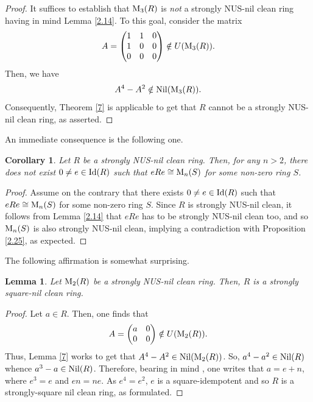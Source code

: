\documentclass[12pt]{amsart}
\newtheorem{lemma}[theorem]{Lemma}
\newtheorem{corollary}[theorem]{Corollary}
\theoremstyle{definition}
\begin{document}
\begin{proof}
It suffices to establish that ${\rm M}_3(R)$ is {\it not} a strongly NUS-nil clean ring having in mind Lemma \ref{2.14}. To this goal, consider the matrix
	$$A =\begin{pmatrix}
		1 & 1 & 0 \\
		1 & 0 & 0 \\
		0 & 0 & 0
\end{pmatrix} \notin U({\rm M}_3(R)).$$ Then, we have $$A^4- A^2 \notin {\rm Nil}({\rm M}_3(R)).$$ Consequently, Theorem \ref{7} is applicable to get that $R$ cannot be a strongly NUS-nil clean ring, as asserted.
\end{proof}

An immediate consequence is the following one.

\begin{corollary}\label{2.35}
Let $R$ be a strongly NUS-nil clean ring. Then, for any $n>2$, there does not exist $0\neq e\in {\rm Id}(R)$ such that $eRe\cong {\rm M}_{n}(S)$ for some non-zero ring $S$.
\end{corollary}

\begin{proof}
Assume on the contrary that there exists $0\neq e\in {\rm Id}(R)$ such that $eRe\cong {\rm M}_{n}(S)$ for some non-zero ring $S$. Since $R$ is strongly NUS-nil clean, it follows from Lemma \ref{2.14} that $eRe$ has to be strongly NUS-nil clean too, and so ${\rm M}_{n}(S)$ is also strongly NUS-nil clean, implying a contradiction with Proposition \ref{2.25}, as expected.
\end{proof}

The following affirmation is somewhat surprising.

\begin{lemma}\label{2.26}
Let ${\rm M}_2(R)$ be a strongly NUS-nil clean ring. Then, $R$ is a strongly square-nil clean ring.
\end{lemma}

\begin{proof}
Let $a \in R$. Then, one finds that $$A=\begin{pmatrix}
		a & 0 \\ 0 & 0
\end{pmatrix} \notin U({\rm M}_2(R)).$$ Thus, Lemma \ref{7} works to get that $A^4-A^2 \in {\rm Nil}({\rm M}_2(R))$. So, $a^4- a^2 \in {\rm Nil}(R)$ whence $a^3- a \in {\rm Nil}(R)$. Therefore, bearing in mind 
\cite[Theorem 2.12]{zhou}, one writes that $a=e+n$, where $e^3=e$ and $en=ne$. As $e^4=e^2$, $e$ is a square-idempotent and so $R$ is a strongly-square nil clean ring, as formulated.
\end{proof}
\end{document}
